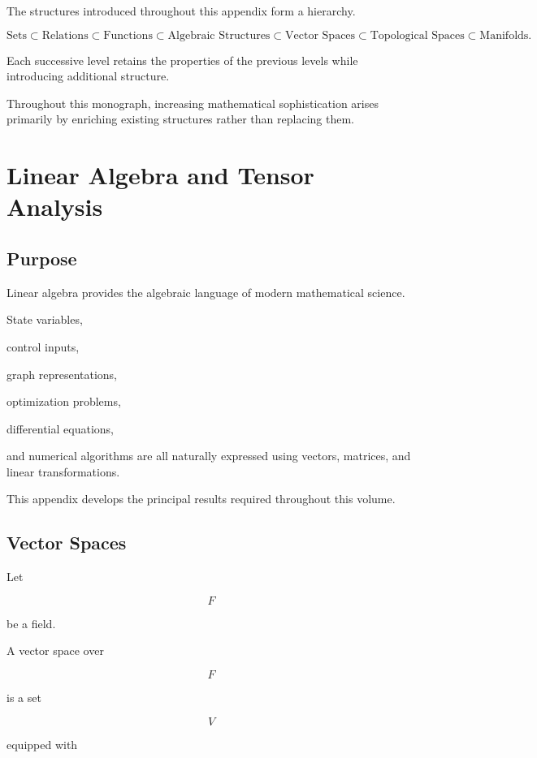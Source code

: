 \documentclass[11pt,fleqn]{book}
\numberwithin{equation}{chapter}
\theoremstyle{plain}
\theoremstyle{definition}
\theoremstyle{remark}
\begin{document}
The structures introduced throughout this appendix form a hierarchy.

\[
\text{Sets}
\subset
\text{Relations}
\subset
\text{Functions}
\subset
\text{Algebraic Structures}
\subset
\text{Vector Spaces}
\subset
\text{Topological Spaces}
\subset
\text{Manifolds}.
\]

Each successive level retains the properties of the previous levels
while introducing additional structure.

Throughout this monograph, increasing mathematical sophistication arises
primarily by enriching existing structures rather than replacing them.

\chapter{Linear Algebra and Tensor Analysis}

\section{Purpose}

Linear algebra provides the algebraic language of modern mathematical
science.

State variables,

control inputs,

graph representations,

optimization problems,

differential equations,

and numerical algorithms are all naturally expressed using vectors,
matrices, and linear transformations.

This appendix develops the principal results required throughout this
volume.


\section{Vector Spaces}

Let

\[
F
\]

be a field.

A vector space over

\[
F
\]

is a set

\[
V
\]

equipped with
\end{document}
